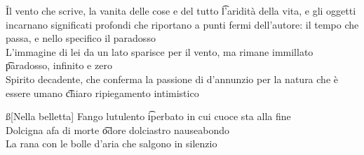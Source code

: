 \documentclass[12pt]{article}
\begin{document}
\v

Il vento che scrive, la vanita delle cose e del tutto \t l'aridità della vita, e gli oggetti incarnano significati profondi che riportano a punti fermi dell'autore: il tempo che passa, e nello specifico il paradosso \\
L'immagine di lei da un lato sparisce per il vento, ma rimane immillato \t paradosso, infinito e zero \\
Spirito decadente, che conferma la passione di d'annunzio per la natura che è essere umano \t chiaro ripiegamento intimistico

\ss[Nella belletta]
Fango lutulento \t iperbato in cui cuoce sta alla fine \\
Dolcigna afa di morte \t odore dolciastro nauseabondo \\
La rana con le bolle d'aria che salgono in silenzio
\end{document}
